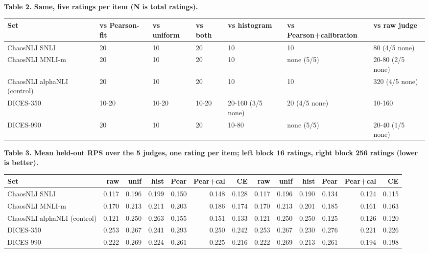 \documentclass[10pt]{article}
\begin{document}
\textbf{Table 2. Same, five ratings per item (N is total ratings).}\par
\footnotesize
\begin{tabular}{lllllll}\toprule
Set & vs Pearson-fit & vs uniform & vs both & vs histogram & vs Pearson+calibration & vs raw judge \\ \midrule
ChaosNLI SNLI & 20 & 10 & 20 & 10 & 10 & 80 (4/5 none) \\
ChaosNLI MNLI-m & 20 & 10 & 20 & 10 & none (5/5) & 20-80 (2/5 none) \\
ChaosNLI alphaNLI (control) & 20 & 10 & 20 & 10 & 10 & 320 (4/5 none) \\
DICES-350 & 10-20 & 10-20 & 10-20 & 20-160 (3/5 none) & 20 (4/5 none) & 10-160 \\
DICES-990 & 20 & 10 & 20 & 10-80 & none (5/5) & 20-40 (1/5 none) \\
\bottomrule\end{tabular}


\textbf{Table 3. Mean held-out RPS over the 5 judges, one rating per item; left block 16 ratings, right block 256 ratings (lower is better).}\par
\footnotesize
\begin{tabular}{lrrrrrrrrrrrr}\toprule
Set & raw & unif & hist & Pear & Pear+cal & CE & raw & unif & hist & Pear & Pear+cal & CE \\ \midrule
ChaosNLI SNLI & 0.117 & 0.196 & 0.199 & 0.150 & 0.148 & 0.128 & 0.117 & 0.196 & 0.190 & 0.134 & 0.124 & 0.115 \\
ChaosNLI MNLI-m & 0.170 & 0.213 & 0.211 & 0.203 & 0.186 & 0.174 & 0.170 & 0.213 & 0.201 & 0.185 & 0.161 & 0.163 \\
ChaosNLI alphaNLI (control) & 0.121 & 0.250 & 0.263 & 0.155 & 0.151 & 0.133 & 0.121 & 0.250 & 0.250 & 0.125 & 0.126 & 0.120 \\
DICES-350 & 0.253 & 0.267 & 0.241 & 0.293 & 0.250 & 0.242 & 0.253 & 0.267 & 0.230 & 0.276 & 0.221 & 0.226 \\
DICES-990 & 0.222 & 0.269 & 0.224 & 0.261 & 0.225 & 0.216 & 0.222 & 0.269 & 0.213 & 0.261 & 0.194 & 0.198 \\
\bottomrule\end{tabular}
\end{document}
